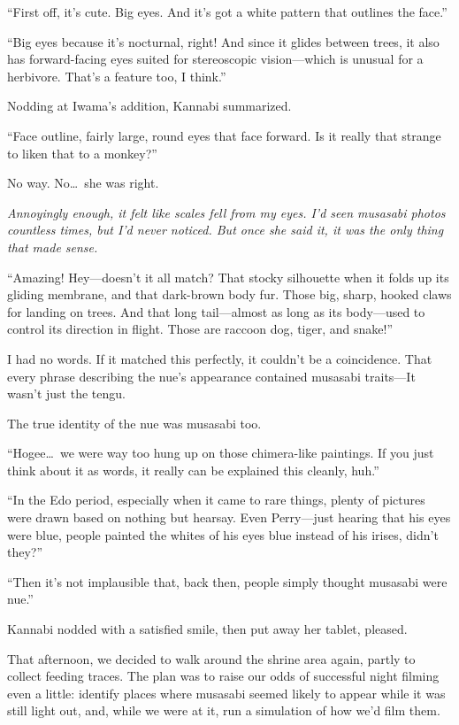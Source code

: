 \documentclass[
    a4paper,
    12pt,
    twoside,
    openany,
    UTF8,
    fontset=windows
]{ctexbook}
\begin{document}
``First off, it's cute. Big eyes. And it's got a white pattern that outlines the face.''

``Big eyes because it's nocturnal, right! And since it glides between trees, it also has forward-facing eyes suited for stereoscopic vision---which is unusual for a herbivore. That's a feature too, I think.''

Nodding at Iwama's addition, Kannabi summarized.

``Face outline, fairly large, round eyes that face forward. Is it really that strange to liken that to a monkey?''

No way. No\dots\ she was right.

\textit{Annoyingly enough, it felt like scales fell from my eyes. I'd seen musasabi photos countless times, but I'd never noticed. But once she said it, it was the only thing that made sense.}

``Amazing! Hey---doesn't it all match? That stocky silhouette when it folds up its gliding membrane, and that dark-brown body fur. Those big, sharp, hooked claws for landing on trees. And that long tail---almost as long as its body---used to control its direction in flight. Those are raccoon dog, tiger, and snake!''

I had no words. If it matched this perfectly, it couldn't be a coincidence. That every phrase describing the nue's appearance contained musasabi traits---It wasn't just the tengu.

The true identity of the nue was musasabi too.

``Hogee\dots\ we were way too hung up on those chimera-like paintings. If you just think about it as words, it really can be explained this cleanly, huh.''

``In the Edo period, especially when it came to rare things, plenty of pictures were drawn based on nothing but hearsay. Even Perry---just hearing that his eyes were blue, people painted the whites of his eyes blue instead of his irises, didn't they?''

``Then it's not implausible that, back then, people simply thought musasabi were nue.''

Kannabi nodded with a satisfied smile, then put away her tablet, pleased.

That afternoon, we decided to walk around the shrine area again, partly to collect feeding traces. The plan was to raise our odds of successful night filming even a little: identify places where musasabi seemed likely to appear while it was still light out, and, while we were at it, run a simulation of how we'd film them.
\end{document}
